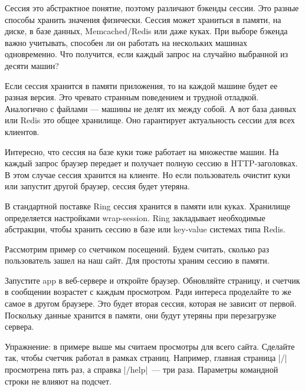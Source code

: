 Сессия это абстрактное понятие, поэтому различают бэкенды сессии. Это разные
способы хранить значения физически. Сессия может храниться в памяти, на диске, в
базе данных, Memcached/Redis или даже куках. При выборе бэкенда важно учитывать,
способен ли он работать на нескольких машинах одновременно. Что получится, если
каждый запрос на случайно выбранной из десяти машин?

Если сессия хранится в памяти приложения, то на каждой машине будет ее разная
версия. Это чревато странным поведением и трудной отладкой. Аналогично с файлами
— машины не делят их между собой. А вот база данных или Redis это общее
хранилище. Оно гарантирует актуальность сессии для всех клиентов.

Интересно, что сессия на базе куки тоже работает на множестве машин. На каждый
запрос браузер передает и получает полную сессию в HTTP-заголовках. В этом
случае сессия хранится на клиенте. Но если пользователь очистит куки или
запустит другой браузер, сессия будет утеряна.

В стандартной поставке Ring сессия хранится в памяти или куках. Хранилище
определяется настройками wrap-session. Ring закладывает необходимые абстракции,
чтобы хранить сессию в базе или key-value системах типа Redis.

Рассмотрим пример со счетчиком посещений. Будем считать, сколько раз
пользователь зашел на наш сайт. Для простоты храним сессию в памяти.


Запустите app в веб-сервере и откройте браузер. Обновляйте страницу, и счетчик в
сообщении возрастет с каждым просмотром. Ради интереса проделайте то же самое в
другом браузере. Это будет вторая сессия, которая не зависит от
первой. Поскольку данные хранится в памяти, они будут утеряны при перезагрузке
сервера.

Упражнение: в примере выше мы считаем просмотры для всего сайта. Сделайте так,
чтобы счетчик работал в рамках страниц. Например, главная страница \spverb|/|
просмотрена пять раз, а справка \spverb|/help|~--- три раза. Параметры командной строки
не влияют на подсчет.

